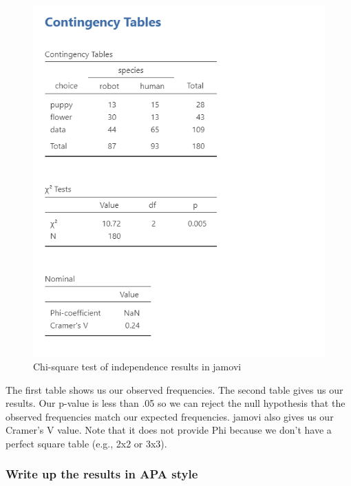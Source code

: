 \documentclass[
]{book}
\begin{document}
\begin{figure}

{\centering \includegraphics[width=1\linewidth]{images/11-independence/independence_results} 

}

\caption{Chi-square test of independence results in jamovi}\label{fig:unnamed-chunk-2}
\end{figure}

The first table shows us our observed frequencies. The second table gives us our results. Our p-value is less than .05 so we can reject the null hypothesis that the observed frequencies match our expected frequencies. jamovi also gives us our Cramer's V value. Note that it does not provide Phi because we don't have a perfect square table (e.g., 2x2 or 3x3).

\hypertarget{write-up-the-results-in-apa-style-4}{%
\subsubsection{Write up the results in APA style}\label{write-up-the-results-in-apa-style-4}}
\end{document}
